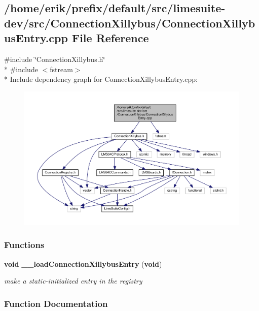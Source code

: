 \subsection{/home/erik/prefix/default/src/limesuite-\/dev/src/\+Connection\+Xillybus/\+Connection\+Xillybus\+Entry.cpp File Reference}
\label{ConnectionXillybusEntry_8cpp}
{\ttfamily \#include \char`\"{}Connection\+Xillybus.\+h\char`\"{}}\\*
{\ttfamily \#include $<$fstream$>$}\\*
Include dependency graph for Connection\+Xillybus\+Entry.\+cpp\+:
\nopagebreak
\begin{figure}[H]
\begin{center}
\leavevmode
\includegraphics[width=350pt]{d5/d22/ConnectionXillybusEntry_8cpp__incl}
\end{center}
\end{figure}
\subsubsection*{Functions}
\begin{DoxyCompactItemize}
\item 
{\bf void} {\bf \+\_\+\+\_\+load\+Connection\+Xillybus\+Entry} ({\bf void})
\begin{DoxyCompactList}\small\item\em make a static-\/initialized entry in the registry \end{DoxyCompactList}\end{DoxyCompactItemize}


\subsubsection{Function Documentation}
